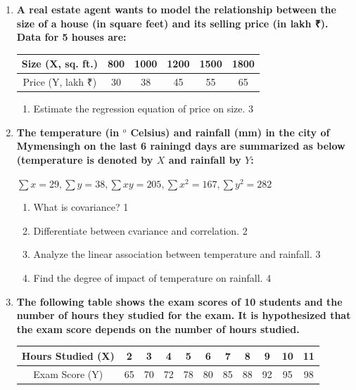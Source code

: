 \documentclass[a4paper,oneside]{book}
\begin{document}
 \begin{enumerate}
 
 \item
  \textbf{A real estate agent wants to model the relationship between the size of a house (in square feet) and its selling price (in lakh ₹). Data for 5 houses are:}

\begin{table}[h!]
\centering
\begin{tabular}{c|c|c|c|c|c}
Size (X, sq. ft.) & 800 & 1000 & 1200 & 1500 & 1800 \\ \hline
Price (Y, lakh ₹) & 30 & 38 & 45 & 55 & 65 \\
\end{tabular}
\end{table}

\begin{enumerate}
    \item
    Estimate the regression equation of price on size. \hfill 3
\end{enumerate}
    
 
  \item
	  \textbf{The temperature (in $^o$ Celsius) and rainfall (mm) in the city of Mymensingh on the last 6 rainingd days are summarized as below (temperature is denoted by $X$ and rainfall by $Y$: } 
	  
	  \begin{center}
	  $\sum x = 29, \sum y = 38, \sum xy = 205, \sum x^2 = 167, \sum y^2 = 282$
  \end{center}
  \begin{enumerate}
    \item
	What is covariance? \hfill 1
    \item
	Differentiate between cvariance and correlation. \hfill 2
    \item  
	Analyze the linear association between temperature and rainfall. \hfill 3
    \item
	Find the degree of impact of temperature on rainfall. \hfill 4
  \end{enumerate}
 
   \item
	  \textbf{The following table shows the exam scores of 10 students and the number of hours they studied for the exam. It is hypothesized that the exam score depends on the number of hours studied.} 
	  
\begin{table}[h!]
\centering
\begin{tabular}{c|c|c|c|c|c|c|c|c|c|c}
Hours Studied (X) & 2 & 3 & 4 & 5 & 6 & 7 & 8 & 9 & 10 & 11 \\ \hline
Exam Score (Y) & 65 & 70 & 72 & 78 & 80 & 85 & 88 & 92 & 95 & 98 \\
\end{tabular}
\end{table}


\end{enumerate}
\end{document}
